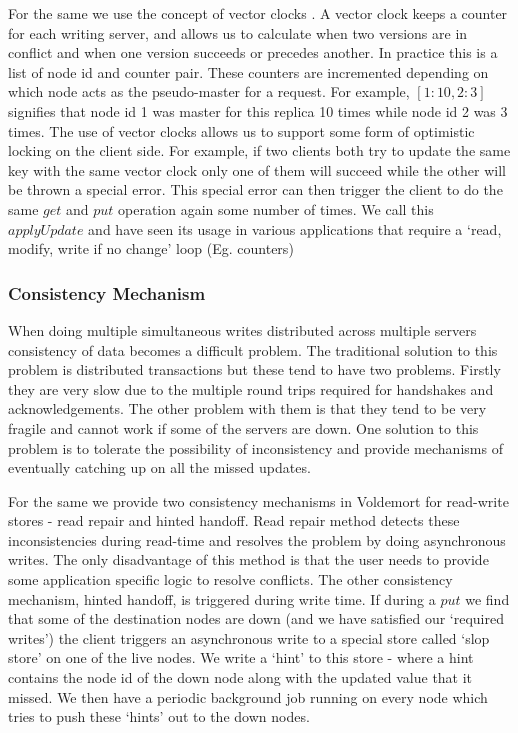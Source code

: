 \documentclass[10pt,twocolumn,preprint,natbib,authoryear]{sigplanconf}
\begin{document}
For the same we use the concept of vector clocks \cite{lamport}. A vector clock keeps a counter for each writing server, and allows us to calculate when two versions are in conflict and when one version succeeds or precedes another. In practice this is a list of node id and counter pair. These counters are incremented depending on which node acts as the pseudo-master for a request. For example,  $[1:10,2:3]$ signifies that node id 1 was master for this replica 10 times while node id 2 was 3 times. The use of vector clocks allows us to support some form of optimistic locking on the client side. For example, if two clients both try to update the same key with the same vector clock only one of them will succeed while the other will be thrown a special error. This special error can then trigger the client to do the same $get$ and $put$ operation again some number of times. We call this $applyUpdate$ and have seen its usage in various applications that require a `read, modify, write if no change' loop (Eg. counters)


\subsubsection {Consistency Mechanism }
\label{sec:system_architecture:system_components:consistency_mechanism}

When doing multiple simultaneous writes distributed across multiple servers consistency of data becomes a difficult problem. The traditional solution to this problem is distributed transactions but these tend to have two problems. Firstly they are very slow due to the multiple round trips required for handshakes and acknowledgements. The other problem with them is that they tend to be very fragile and cannot work if some of the servers are down. One solution to this problem is to tolerate the possibility of inconsistency and provide mechanisms of eventually catching up on all the missed updates. 

For the same we provide two consistency mechanisms in Voldemort for read-write stores - read repair and hinted handoff. Read repair method detects these inconsistencies during read-time and resolves the problem by doing asynchronous writes. The only disadvantage of this method is that the user needs to provide some application specific logic to resolve conflicts. The other consistency mechanism, hinted handoff, is triggered during write time. If during a $put$ we find that some of the destination nodes are down (and we have satisfied our `required writes') the client triggers an asynchronous write to a special store called `slop store' on one of the live nodes. We write a `hint' to this store - where a hint contains the node id of the down node along with the updated value that it missed. We then have a periodic background job running on every node which tries to push these `hints' out to the down nodes.
\end{document}
